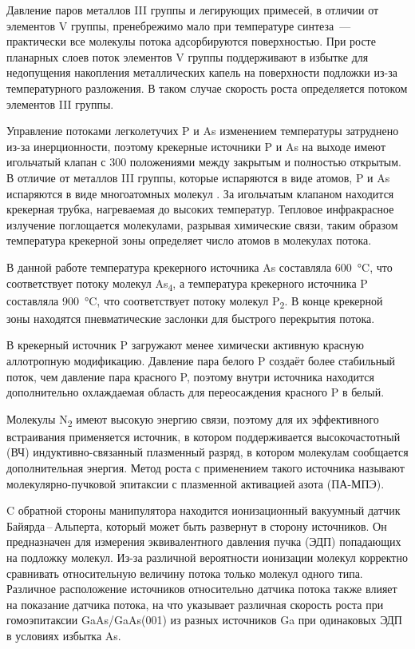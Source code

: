 Давление паров металлов III группы и легирующих примесей, в отличии от
элементов V группы, пренебрежимо мало при температуре синтеза~--- практически
все молекулы потока адсорбируются поверхностью. При росте планарных слоев поток
элементов V группы поддерживают в избытке для недопущения накопления
металлических капель на поверхности подложки из-за температурного разложения. В
таком случае скорость роста определяется потоком элементов III группы.

Управление потоками легколетучих P и As изменением температуры затруднено из-за
инерционности, поэтому крекерные источники P и As на выходе имеют игольчатый
клапан с 300 положениями между закрытым и полностью открытым. В отличие от
металлов III группы, которые испаряются в виде атомов, P и As испаряются в виде
многоатомных молекул \cite{Neave1980}. За игольчатым клапаном находится
крекерная трубка, нагреваемая до высоких температур. Тепловое инфракрасное
излучение поглощается молекулами, разрывая химические связи, таким образом
температура крекерной зоны определяет число атомов в молекулах потока.

В данной работе температура крекерного источника As составляла
600~\si{\degreeCelsius}, что соответствует потоку молекул As\textsubscript{4},
а температура крекерного источника P составляла 900~\si{\degreeCelsius}, что
соответствует потоку молекул P\textsubscript{2}. В конце крекерной зоны
находятся пневматические заслонки для быстрого перекрытия потока.

В крекерный источник P загружают менее химически активную красную аллотропную
модификацию. Давление пара белого P создаёт более стабильный поток, чем
давление пара красного P, поэтому внутри источника находится дополнительно
охлаждаемая область для переосаждения красного P в белый.

Молекулы N\textsubscript{2} имеют высокую энергию связи, поэтому для их
эффективного встраивания применяется источник, в котором поддерживается
высокочастотный (ВЧ) индуктивно-связанный плазменный разряд, в котором
молекулам сообщается дополнительная энергия. Метод роста с применением такого
источника называют молекулярно-пучковой эпитаксии с плазменной активацией азота
(ПА-МПЭ).

C обратной стороны манипулятора находится ионизационный вакуумный датчик
Байярда\,--\,Альперта, который может быть развернут в сторону источников. Он
предназначен для измерения эквивалентного давления пучка (ЭДП) попадающих на
подложку молекул. Из-за различной вероятности ионизации молекул корректно
сравнивать относительную величину потока только молекул одного типа. Различное
расположение источников относительно датчика потока также влияет на показание
датчика потока, на что указывает различная скорость роста при гомоэпитаксии
GaAs/GaAs(001) из разных источников Ga при одинаковых ЭДП в условиях избытка
As.


